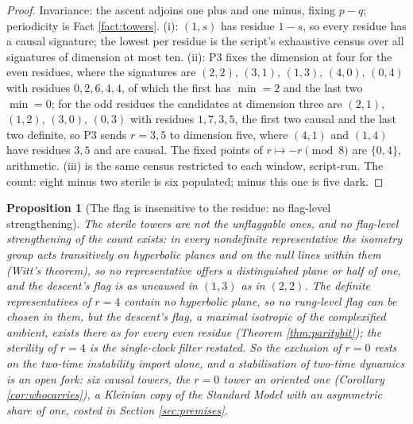 \documentclass[11pt]{article}
\newtheorem{proposition}[theorem]{Proposition}
\theoremstyle{definition}
\begin{document}
\begin{proof}
Invariance: the ascent adjoins one plus and one minus, fixing $p - q$; periodicity is Fact \ref{fact:towers}. (i): $(1,s)$ has residue $1 - s$, so every residue has a causal signature; the lowest per residue is the script's exhaustive census over all signatures of dimension at most ten. (ii): P3 fixes the dimension at four for the even residues, where the signatures are $(2,2)$, $(3,1)$, $(1,3)$, $(4,0)$, $(0,4)$ with residues $0, 2, 6, 4, 4$, of which the first has $\min = 2$ and the last two $\min = 0$; for the odd residues the candidates at dimension three are $(2,1)$, $(1,2)$, $(3,0)$, $(0,3)$ with residues $1, 7, 3, 5$, the first two causal and the last two definite, so P3 sends $r = 3, 5$ to dimension five, where $(4,1)$ and $(1,4)$ have residues $3, 5$ and are causal. The fixed points of $r \mapsto -r \pmod 8$ are $\{0, 4\}$, arithmetic. (iii) is the same census restricted to each window, script-run. The count: eight minus two sterile is six populated; minus this one is five dark.
\end{proof}

\begin{proposition}[The flag is insensitive to the residue: no flag-level strengthening]\label{prop:flaggable}
The sterile towers are not the unflaggable ones, and no flag-level strengthening of the count exists: in every nondefinite representative the isometry group acts transitively on hyperbolic planes and on the null lines within them (Witt's theorem), so no representative offers a distinguished plane or half of one, and the descent's flag is as uncaused in $(1,3)$ as in $(2,2)$. The definite representatives of $r = 4$ contain no hyperbolic plane, so no \emph{rung-level} flag can be chosen in them, but the descent's flag, a maximal isotropic of the complexified ambient, exists there as for every even residue (Theorem \ref{thm:paritybit}); the sterility of $r = 4$ is the single-clock filter restated. So the exclusion of $r = 0$ rests on the two-time instability import alone, and a stabilisation of two-time dynamics is an open fork: six causal towers, the $r = 0$ tower an \emph{oriented} one (Corollary \ref{cor:whocarries}), a Kleinian copy of the Standard Model with an asymmetric share of one, costed in Section \ref{sec:premises}.
\end{proposition}
\end{document}
